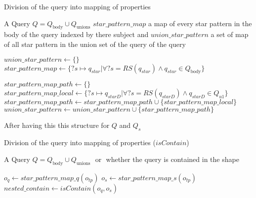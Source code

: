 \begin{algorithm}
   \caption{Division of the query into mapping of properties}\label{alg:divideQuery}
   \begin{algorithmic}
      \REQUIRE A Query $Q = Q_{\text{body}} \cup Q_{\text{unions}}$
      \ENSURE $star\_pattern\_map$ a map of every star pattern in the body of the query indexed by there subject and $union\_star\_pattern$ a set of map of all star pattern in the union set of the query of the query

      \STATE $union\_star\_pattern \leftarrow \{\}$
      \STATE $star\_pattern\_map \leftarrow \{ ?s \mapsto q_{star}| \forall ?s = RS(q_{star}) \land q_{star} \in Q_{\text{body}} \}$ %

         \STATE $star\_pattern\_map\_path \leftarrow \{\}$ %
            \STATE $star\_pattern\_map\_local \leftarrow \{ ?s \mapsto q_{starD}| \forall ?s = RS(q_{starD}) \land q_{starD} \in Q_{u1} \}$ %
            \STATE $star\_pattern\_map\_path \leftarrow star\_pattern\_map\_path \cup \{star\_pattern\_map\_local\}$ 
         \ENDFOR
        \STATE $union\_star\_pattern \leftarrow union\_star\_pattern \cup \{ star\_pattern\_map\_path \}$
      \ENDFOR
   \end{algorithmic}
\end{algorithm}

After having this this structure for $Q$ and $Q_s$

\begin{algorithm}
   \caption{Division of the query into mapping of properties ($isContain$)}\label{alg:divideQuery}
   \begin{algorithmic}
      \REQUIRE A Query $Q = Q_{\text{body}} \cup Q_{\text{unions}}$
      \ENSURE \TRUE $ $ or \FALSE $ $ whether the query is contained in the shape

            \STATE $o_q \leftarrow star\_pattern\_map\_q(o_{tp})$
            \STATE $o_s \leftarrow star\_pattern\_map\_s(o_{tp})$
               \STATE $ nested\_contain \leftarrow isContain(o_q, o_s)$
                  \RETURN \FALSE
               \ENDIF 
            \ENDIF
         \ELSE
            \RETURN \FALSE
         \ENDIF
      \ENDFOR
      \RETURN \TRUE
   \end{algorithmic}
\end{algorithm}

